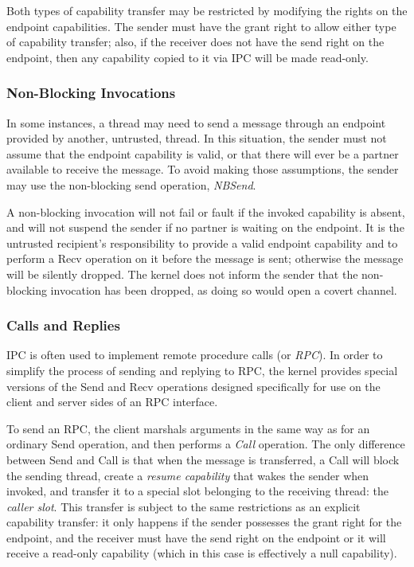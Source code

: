 Both types of capability transfer may be restricted by modifying the rights on the endpoint capabilities. The sender must have the grant right to allow either type of capability transfer; also, if the receiver does not have the send right on the endpoint, then any capability copied to it via IPC will be made read-only.

\subsubsection{Non-Blocking Invocations}

In some instances, a thread may need to send a message through an endpoint
provided by another, untrusted, thread. In this situation, the sender must not
assume that the endpoint capability is valid, or that there will ever be a
partner available to receive the message. To avoid making those assumptions,
the sender may use the non-blocking send operation, \emph{NBSend}.

A non-blocking invocation
will not fail or fault if the invoked capability is absent, and will not
suspend the sender if no partner is waiting on the endpoint. It is the
untrusted recipient's responsibility to provide a valid endpoint capability
and to perform a Recv operation on it before the message is sent; otherwise
the message will be silently dropped. The kernel does not inform the sender
that the non-blocking invocation has been dropped, as doing so would open a
covert channel.

\subsubsection{Calls and Replies}

IPC is often used to implement remote procedure calls (or \emph{RPC}). In order to simplify the process of sending and replying to RPC, the kernel provides special versions of the Send and Recv operations designed specifically for use on the client and server sides of an RPC interface.

To send an RPC, the client marshals arguments in the same way as for an ordinary Send operation, and then performs a \emph{Call} operation. The only difference between Send and Call is that when the message is transferred, a Call will block the sending thread, create a \emph{resume capability} that wakes the sender when invoked, and transfer it to a special slot belonging to the receiving thread: the \emph{caller slot}. This transfer is subject to the same restrictions as an explicit capability transfer: it only happens if the sender possesses the grant right for the endpoint, and the receiver must have the send right on the endpoint or it will receive a read-only capability (which in this case is effectively a null capability).

